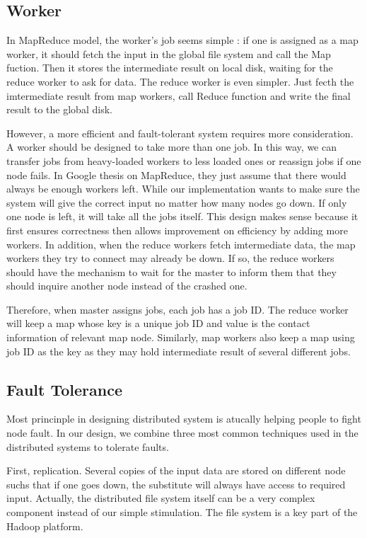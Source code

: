 \documentclass[12pt]{article}
\begin{document}
\subsection{Worker}

In MapReduce model, the worker's job seems simple : if one is assigned as a map worker, it should fetch the input in the global file system and
call the Map fuction. Then it stores the intermediate result on local disk, waiting for the reduce worker to ask for data. The reduce worker
is even simpler. Just fecth the imtermediate result from map workers, call Reduce function and write the final result to the global disk. 

However, a more efficient and fault-tolerant system requires more consideration. A worker should be designed to take more than one job. In this
way, we can transfer jobs from heavy-loaded workers to less loaded ones or reassign jobs if one node fails. In Google thesis on MapReduce, they just assume that there would always be enough workers left. While our implementation wants to make sure the system will give the correct input no matter how many nodes go down. If only one node is left, it will take all the jobs itself. This design makes sense because it first ensures correctness then allows improvement on efficiency by adding more workers.
In addition, when the reduce workers fetch imtermediate data, the map workers they try to connect may already be down. If so, the reduce workers
should have the mechanism to wait for the master to inform them that they should inquire another node instead of the crashed one.

Therefore, when master assigns jobs, each job has a job ID. The reduce worker will keep a map whose key is a unique job ID and value is the contact information of relevant map node. Similarly, map workers also keep a map using job ID as the key as they may hold intermediate result of several different jobs.
    
\subsection{Fault Tolerance}

Most princinple in designing distributed system is atucally helping people to fight node fault. In our design, we combine three most common techniques used in the distributed systems to tolerate faults.

First, replication. Several copies of the input data are stored on different node suchs that if one goes down, the substitute will always have access to required input. Actually, the distributed file system itself can be a very complex component instead of our simple stimulation. The file system is a key part of the Hadoop platform.   
\end{document}
